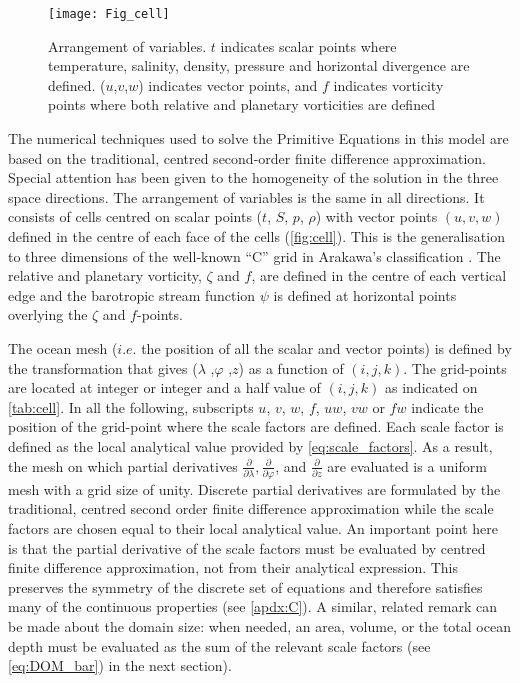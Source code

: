 \documentclass[../tex_main/NEMO_manual]{subfiles}
\begin{document}
\begin{figure}[!tb]    \begin{center}
\texttt{[image: Fig\_cell]}
\caption{ \protect\label{fig:cell}
  Arrangement of variables.
  $t$ indicates scalar points where temperature, salinity, density, pressure and horizontal divergence are defined.
  ($u$,$v$,$w$) indicates vector points,
  and $f$ indicates vorticity points where both relative and planetary vorticities are defined}
\end{center}   \end{figure}

The numerical techniques used to solve the Primitive Equations in this model are based on the traditional,
centred second-order finite difference approximation.
Special attention has been given to the homogeneity of the solution in the three space directions.
The arrangement of variables is the same in all directions.
It consists of cells centred on scalar points ($t$, $S$, $p$, $\rho$) with vector points $(u, v, w)$ defined in
the centre of each face of the cells (\autoref{fig:cell}).
This is the generalisation to three dimensions of the well-known ``C'' grid in Arakawa's classification
\citep{Mesinger_Arakawa_Bk76}.
The relative and planetary vorticity, $\zeta$ and $f$, are defined in the centre of each vertical edge and
the barotropic stream function $\psi$ is defined at horizontal points overlying the $\zeta$ and $f$-points.

The ocean mesh ($i.e.$ the position of all the scalar and vector points) is defined by
the transformation that gives ($\lambda$ ,$\varphi$ ,$z$) as a function of $(i,j,k)$.
The grid-points are located at integer or integer and a half value of $(i,j,k)$ as indicated on \autoref{tab:cell}.
In all the following, subscripts $u$, $v$, $w$, $f$, $uw$, $vw$ or $fw$ indicate the position of
the grid-point where the scale factors are defined.
Each scale factor is defined as the local analytical value provided by \autoref{eq:scale_factors}.
As a result,
the mesh on which partial derivatives $\frac{\partial}{\partial \lambda}, \frac{\partial}{\partial \varphi}$,
and $\frac{\partial}{\partial z} $ are evaluated is a uniform mesh with a grid size of unity.
Discrete partial derivatives are formulated by the traditional,
centred second order finite difference approximation while
the scale factors are chosen equal to their local analytical value.
An important point here is that the partial derivative of the scale factors must be evaluated by
centred finite difference approximation, not from their analytical expression.
This preserves the symmetry of the discrete set of equations and
therefore satisfies many of the continuous properties (see \autoref{apdx:C}).
A similar, related remark can be made about the domain size:
when needed, an area, volume, or the total ocean depth must be evaluated as the sum of the relevant scale factors
(see \autoref{eq:DOM_bar}) in the next section).
\end{document}
